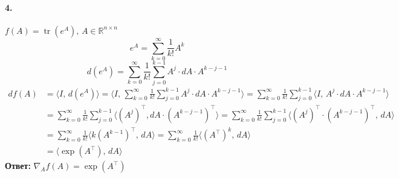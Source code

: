 \documentclass{article}
\DeclareMathOperator{\tr}{tr}
\newcommand*{\R}{\mathbb{R}}
\begin{document}
\paragraph{4.} $f(A) = \tr(e^A),\, A \in \R^{n \times n}$
\[ e^A = \sum\limits_{k = 0}^\infty \frac{1}{k!} A^k \]
\[ d(e^A) = \sum\limits_{k = 0}^\infty \frac{1}{k!} \sum\limits_{j = 0}^{k - 1} A^{j} \cdot dA \cdot A^{k - j - 1} \]
\begin{equation*}
\begin{aligned}
    df(A) &= \big\langle I,\, d(e^A) \big\rangle = \bigg\langle I,\, \sum\limits_{k = 0}^\infty \frac{1}{k!} \sum\limits_{j = 0}^{k - 1} A^{j} \cdot dA \cdot A^{k - j - 1} \bigg\rangle = \sum\limits_{k = 0}^\infty \frac{1}{k!} \sum\limits_{j = 0}^{k - 1} \big\langle I,\, A^{j} \cdot dA \cdot A^{k - j - 1} \big\rangle \\
    &= \sum\limits_{k = 0}^\infty \frac{1}{k!} \sum\limits_{j = 0}^{k - 1} \big\langle (A^j)^{\top}, dA \cdot (A^{k - j - 1})^{\top} \big\rangle = \sum\limits_{k = 0}^\infty \frac{1}{k!} \sum\limits_{j = 0}^{k - 1} \big\langle (A^j)^{\top} \cdot (A^{k - j - 1})^{\top},\, dA \big\rangle \\
    &= \sum\limits_{k = 0}^\infty \frac{1}{k!} \big\langle k (A^{k - 1})^{\top},\, dA \big\rangle = \sum\limits_{k = 0}^\infty \frac{1}{k!} \big\langle (A^{\top})^k,\, dA \big\rangle \\
    &= \big\langle \exp(A^{\top}),\, dA \big\rangle
\end{aligned}
\end{equation*}
\textbf{Ответ:} $\nabla_A f(A) = \exp(A^{\top})$
\end{document}
